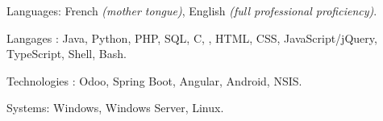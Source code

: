 \begin{indentsection}{\parindent}
\begin{description*}
  \item[Languages:]
  French \emph{(mother tongue)}, English \emph{(full professional proficiency)}.
 \item[Langages :] Java, Python, PHP, SQL, C, \Csharp, HTML,
  CSS, JavaScript/jQuery, TypeScript, Shell, Bash.
  \item[Technologies :] Odoo, Spring Boot, Angular, Android, NSIS.
  \item[Systems:] Windows, Windows Server, Linux.
\end{description*}
\end{indentsection}
